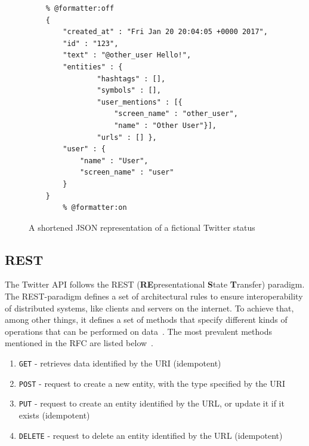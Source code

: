 
\begin{figure}
    \caption{A shortened JSON representation of a fictional Twitter status}
    \label{code:json}
    \begin{verbatim}
    % @formatter:off
    {
        "created_at" : "Fri Jan 20 20:04:05 +0000 2017",
        "id" : "123",
        "text" : "@other_user Hello!",
        "entities" : {
                "hashtags" : [],
                "symbols" : [],
                "user_mentions" : [{
                    "screen_name" : "other_user",
                    "name" : "Other User"}],
                "urls" : [] },
        "user" : {
            "name" : "User",
            "screen_name" : "user"
        }
    }
        % @formatter:on
    \end{verbatim}
\end{figure}

\subsection{REST}
\label{subsec:rest}

The Twitter API follows the REST (\textbf{RE}presentational \textbf{S}tate \textbf{T}ransfer) paradigm.
The REST-paradigm defines a set of architectural rules to ensure interoperability of distributed systems,
like clients and servers on the internet.
To achieve that, among other things,
it defines a set of methods that specify different kinds of operations that can be performed on data~\cite{Jakl2008}.
The most prevalent methods mentioned in the RFC are listed below~\cite{RFC2616}.

\begin{enumerate}
    \item
    \texttt{GET} - retrieves data identified by the URI (idempotent)
    \item
    \texttt{POST} - request to create a new entity, with the type specified by the URI
    \item
    \texttt{PUT} - request to create an entity identified by the URL, or update it if it exists (idempotent)
    \item
    \texttt{DELETE} - request to delete an entity identified by the URL (idempotent)
\end{enumerate}

